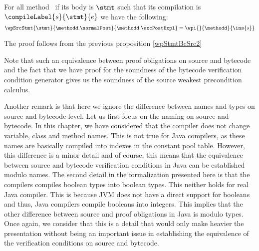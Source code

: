 \begin{theorem}
For all method \methodd \ if its body is $\stmt$ such that its compilation is 
 $\compileLabel{s}{\stmt}{e}$  we have the following:
$$ \wpSrcStmt{\stmt}{\methodd.\normalPost }{\methodd.\excPostExpl }  = \wpi{}{\methodd}{\ins{s} }$$
\end{theorem}
The proof follows from the previous proposition \ref{wpStmtBcSrc2}




Note that such an equivalence between proof obligations on source and bytecode and the fact that
we have proof for the soundness of the bytecode verification condition generator
 gives us the soundness of the source  weakest precondition calculus.  

Another remark is that here we ignore the difference between names and types on  source and bytecode level. 
Let us first focus on the naming on source and bytecode. 
In this chapter, we have considered that the compiler  does not change  variable, class and method  names.
 This is not true for Java compilers, as these names are basically compiled into 
indexes in the constant pool table. However, this difference is a minor detail and of course, this means that 
the equivalence between source and bytecode verification conditions in Java can be established modulo names.
The second detail in the formalization presented here is that the compilers compiles boolean types into boolean types.
This neither holds for real Java compiler. This is because JVM does not have a direct support  for booleans and thus,
Java compilers compile booleans into integers. This implies that the other difference between source and proof
obligations in Java is modulo types. Once again, we consider that this is a detail that would only make heavier
the presentation without being an important issue in establishing the equivalence of the verification conditions on source and bytecode. 
